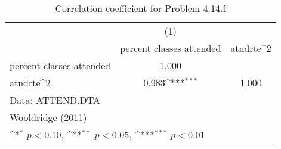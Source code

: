 \begin{table}[htbp]\centering
\def\sym#1{\ifmmode^{#1}\else\(^{#1}\)\fi}
\caption{Correlation coefficient for Problem 4.14.f}
\begin{tabular}{l*{2}{c}}
\toprule
                &\multicolumn{1}{c}{(1)}         &                  \\
                &percent classes attended         &atndrte^2         \\
\midrule
percent classes attended&    1.000         &                  \\
atndrte^2       &    0.983\sym{***}&    1.000         \\
\bottomrule
\multicolumn{3}{l}{\footnotesize Data: ATTEND.DTA}\\
\multicolumn{3}{l}{\footnotesize Wooldridge (2011)}\\
\multicolumn{3}{l}{\footnotesize \sym{*} \(p<0.10\), \sym{**} \(p<0.05\), \sym{***} \(p<0.01\)}\\
\end{tabular}
\end{table}
